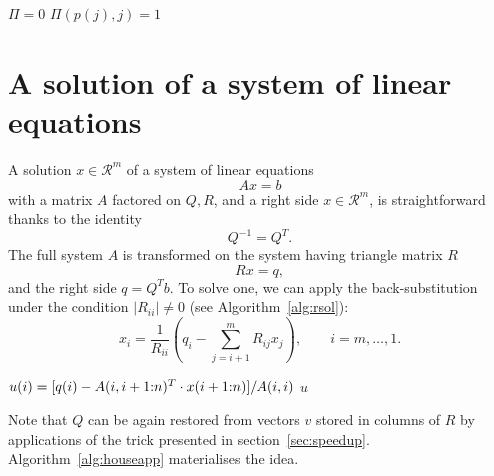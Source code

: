 \begin{refsection}
\begin{algorithm}
  \caption{Compilation of the permutation matrix}
  \label{alg:perm}
  \begin{algorithmic}
    \State $\Pi = 0$
    \State $\Pi(p(j),j) = 1$
    \EndFor
  \end{algorithmic}
\end{algorithm}



\section{A solution of a system of linear equations}
\label{sec:lineq}



A solution $x \in \mathcal{R}^m$ of a system of linear equations
\begin{equation}
  Ax = b
\end{equation}
with a matrix $A$ factored on $Q,R$, and a right side $x \in \mathcal{R}^m$,
is straightforward thanks to the identity
\begin{equation}
  Q^{-1} = Q^T.
\end{equation}
The full system $A$ is transformed on the system having triangle matrix $R$
\begin{equation}
  Rx = q,
\end{equation}
and the right side $q = Q^T b$. To solve one,
we can apply the back-substitution under the condition
$\lvert R_{ii} \rvert \ne 0$ (see Algorithm~\ref{alg:rsol}):
\begin{equation}
  x_i = \frac{1}{R_{ii}} \left(
  q_i - \sum_{j=i+1}^m R_{ij} x_j \right), \qquad i = m, \ldots, 1.
\end{equation}

\begin{algorithm}
  \caption{Solution of $Rx=q$ with back-substitution}
  \label{alg:rsol}
  \begin{algorithmic}
    \State {}
    \State $u(i) = [q(i) - A(i,i+1{:}n)^T \cdot x(i+1{:}n)] / A(i,i)$
    \EndFor
    \State \Return $u$
    \EndFunction
  \end{algorithmic}
\end{algorithm}


Note that $Q$ can be again restored from vectors $v$ stored in columns of $R$
by applications of the trick presented in section~\ref{sec:speedup}.
Algorithm~\ref{alg:houseapp} materialises the idea.


\end{refsection}
